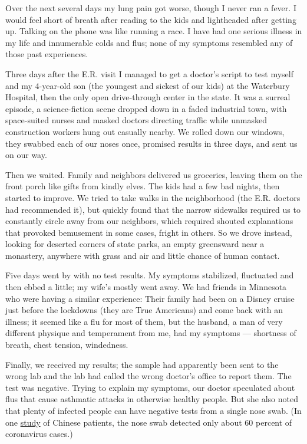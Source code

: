 Over the next several days my lung pain got worse, though I never ran a
fever. I would feel short of breath after reading to the kids and
lightheaded after getting up. Talking on the phone was like running a
race. I have had one serious illness in my life and innumerable colds
and flus; none of my symptoms resembled any of those past experiences.

Three days after the E.R. visit I managed to get a doctor's script to
test myself and my 4-year-old son (the youngest and sickest of our kids)
at the Waterbury Hospital, then the only open drive-through center in
the state. It was a surreal episode, a science-fiction scene dropped
down in a faded industrial town, with space-suited nurses and masked
doctors directing traffic while unmasked construction workers hung out
casually nearby. We rolled down our windows, they swabbed each of our
noses once, promised results in three days, and sent us on our way.

Then we waited. Family and neighbors delivered us groceries, leaving
them on the front porch like gifts from kindly elves. The kids had a few
bad nights, then started to improve. We tried to take walks in the
neighborhood (the E.R. doctors had recommended it), but quickly found
that the narrow sidewalks required us to constantly circle away from our
neighbors, which required shouted explanations that provoked bemusement
in some cases, fright in others. So we drove instead, looking for
deserted corners of state parks, an empty greensward near a monastery,
anywhere with grass and air and little chance of human contact.

Five days went by with no test results. My symptoms stabilized,
fluctuated and then ebbed a little; my wife's mostly went away. We had
friends in Minnesota who were having a similar experience: Their family
had been on a Disney cruise just before the lockdowns (they are True
Americans) and come back with an illness; it seemed like a flu for most
of them, but the husband, a man of very different physique and
temperament from me, had my symptoms --- shortness of breath, chest
tension, windedness.

Finally, we received my results; the sample had apparently been sent to
the wrong lab and the lab had called the wrong doctor's office to report
them. The test was negative. Trying to explain my symptoms, our doctor
speculated about flus that cause asthmatic attacks in otherwise healthy
people. But she also noted that plenty of infected people can have
negative tests from a single nose swab. (In one
\href{https://jamanetwork.com/journals/jama/fullarticle/2762997}{study}
of Chinese patients, the nose swab detected only about 60 percent of
coronavirus cases.)

